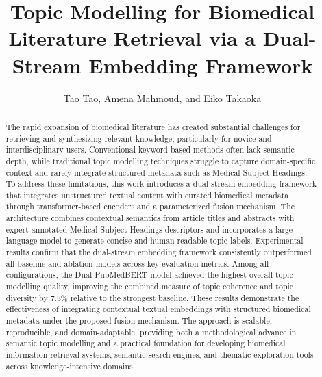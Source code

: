 \documentclass[authorproof,JACIII,researchpaper]{fujipressarticle}
\begin{document}
\pagestyle{fujipressstyle}

\title{Topic Modelling for Biomedical Literature Retrieval via a Dual-Stream Embedding Framework}
\author{Tao Tao, Amena Mahmoud, and Eiko Takaoka}
\address{Graduate School of Science and Technology, Sophia University, Tokyo 102-8554, Japan\\
Department of Computer Science, Faculty of Computers and Information, Kafrelsheikh University, Kafrelsheikh 33516, Egypt\\
E-mail: c2578666@eagle.sophia.ac.jp, m-g-eiko@sophia.ac.jp}
\maketitle


\begin{abstract}%
\noindent The rapid expansion of biomedical literature has created substantial challenges for retrieving and synthesizing relevant knowledge, particularly for novice and interdisciplinary users. Conventional keyword-based methods often lack semantic depth, while traditional topic modelling techniques struggle to capture domain-specific context and rarely integrate structured metadata such as Medical Subject Headings. To address these limitations, this work introduces a dual-stream embedding framework that integrates unstructured textual content with curated biomedical metadata through transformer-based encoders and a parameterized fusion mechanism. The architecture combines contextual semantics from article titles and abstracts with expert-annotated Medical Subject Headings descriptors and incorporates a large language model to generate concise and human-readable topic labels. Experimental results confirm that the dual-stream embedding framework consistently outperformed all baseline and ablation models across key evaluation metrics. Among all configurations, the Dual PubMedBERT model achieved the highest overall topic modelling quality, improving the combined measure of topic coherence and topic diversity by 7.3\% relative to the strongest baseline. These results demonstrate the effectiveness of integrating contextual textual embeddings with structured biomedical metadata under the proposed fusion mechanism. The approach is scalable, reproducible, and domain-adaptable, providing both a methodological advance in semantic topic modelling and a practical foundation for developing biomedical information retrieval systems, semantic search engines, and thematic exploration tools across knowledge-intensive domains.
\end{abstract}
\end{document}
